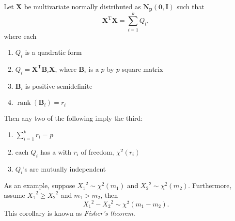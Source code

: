 \documentclass[12pt]{article}
\begin{document}
Let $\textbf{X}$ be multivariate normally distributed as $\boldsymbol{N_p(0,I)}$ such that 
$$\textbf{X}^{\operatorname{T}}\textbf{X}=\sum_{i=1}^{k}Q_i,$$
where each 
\begin{enumerate}
\item $Q_i$ is a quadratic form
\item $Q_i=\textbf{X}^{\operatorname{T}}\textbf{B}_i\textbf{X}$, where $\textbf{B}_i$ is a $p$ by $p$ square matrix
\item $\textbf{B}_i$ is positive semidefinite
\item $\operatorname{rank}(\textbf{B}_i)=r_i$
\end{enumerate}
Then any two of the following imply the third:
\begin{enumerate}
\item $\sum_{i=1}^{k}r_i=p$
\item each $Q_i$ has a  with $r_i$  of freedom, $\chi^2(r_i)$
\item $Q_i$'s are mutually independent
\end{enumerate}
\par
As an example, suppose ${X_1}^2\sim\chi^2(m_1)$ and ${X_2}^2\sim\chi^2(m_2)$.  Furthermore, assume ${X_1}^2\geq {X_2}^2$ and $m_1>m_2$, then $${X_1}^2-{X_2}^2\sim\chi^2(m_1-m_2).$$  This corollary is known as \emph{Fisher's theorem}.
\end{document}
